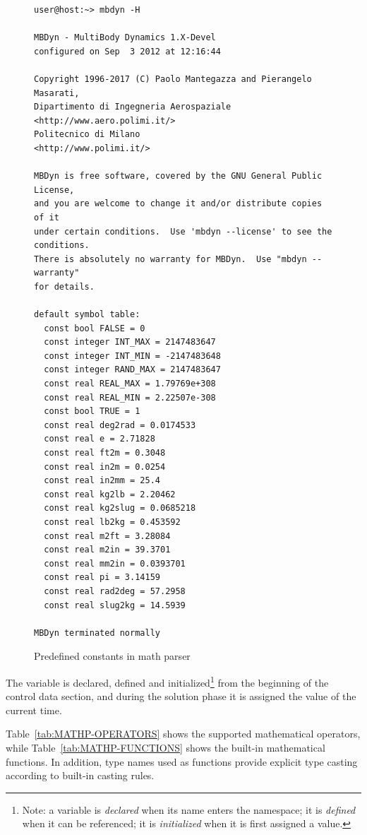 \begin{figure}
\label{fig:MBDYN-H}
\centering
\small
\begin{minipage}{120mm}
\begin{verbatim}
user@host:~> mbdyn -H

MBDyn - MultiBody Dynamics 1.X-Devel
configured on Sep  3 2012 at 12:16:44

Copyright 1996-2017 (C) Paolo Mantegazza and Pierangelo Masarati,
Dipartimento di Ingegneria Aerospaziale <http://www.aero.polimi.it/>
Politecnico di Milano                   <http://www.polimi.it/>

MBDyn is free software, covered by the GNU General Public License,
and you are welcome to change it and/or distribute copies of it
under certain conditions.  Use 'mbdyn --license' to see the conditions.
There is absolutely no warranty for MBDyn.  Use "mbdyn --warranty"
for details.

default symbol table:
  const bool FALSE = 0
  const integer INT_MAX = 2147483647
  const integer INT_MIN = -2147483648
  const integer RAND_MAX = 2147483647
  const real REAL_MAX = 1.79769e+308
  const real REAL_MIN = 2.22507e-308
  const bool TRUE = 1
  const real deg2rad = 0.0174533
  const real e = 2.71828
  const real ft2m = 0.3048
  const real in2m = 0.0254
  const real in2mm = 25.4
  const real kg2lb = 2.20462
  const real kg2slug = 0.0685218
  const real lb2kg = 0.453592
  const real m2ft = 3.28084
  const real m2in = 39.3701
  const real mm2in = 0.0393701
  const real pi = 3.14159
  const real rad2deg = 57.2958
  const real slug2kg = 14.5939

MBDyn terminated normally
\end{verbatim}
\end{minipage}
\caption{Predefined constants in math parser}
\end{figure}

The variable  is declared, defined and initialized\footnote{
    Note: a variable is \emph{declared} when its name enters the namespace;
    it is \emph{defined} when it can be referenced;
    it is \emph{initialized} when it is first assigned a value.
} from the beginning of the control data section, and during the solution 
phase it is assigned the value of the current time. 

Table~\ref{tab:MATHP-OPERATORS} shows the supported mathematical 
operators, while Table~\ref{tab:MATHP-FUNCTIONS} shows the built-in
mathematical functions.
In addition, type names used as functions provide explicit type casting
according to built-in casting rules.

